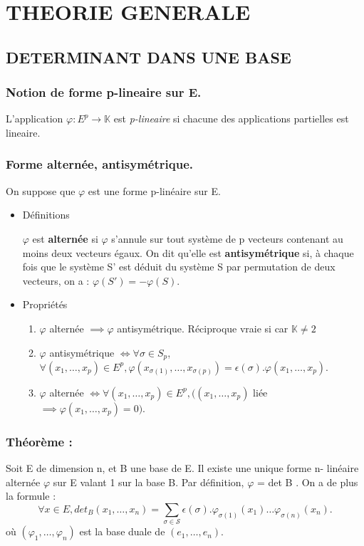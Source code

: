 \documentclass[a4paper,12pt]{article}
\title{\letitle}
\author{\leauthor}
\date{}
\begin{document}
    \section{THEORIE GENERALE}

\subsection{DETERMINANT DANS UNE BASE}

\subsubsection{Notion de forme p-lineaire sur E.}

L'application $\varphi:E^p \rightarrow \mathbb{K}$ est {\it p-lineaire}
si chacune des applications partielles est lineaire.

\subsubsection{Forme alternée, antisymétrique.}

On suppose que $\varphi$ est une forme p-linéaire sur E.
\begin{itemize}
\item Définitions

$\varphi$ est \textbf{ alternée } si $\varphi$ s’annule sur tout système de p vecteurs contenant au moins
deux vecteurs égaux. On dit qu’elle est \textbf{ antisymétrique } si, à chaque fois que le système S'
est déduit du système S par permutation de deux vecteurs, on a : $\varphi(S')=-\varphi(S)$.


\item Propriétés

\begin{enumerate}
\item $\varphi$ alternée $\implies \varphi$ antisymétrique. Réciproque vraie si car $\mathbb{K}\neq 2$

\item $\varphi$ 
antisymétrique
$\iff \forall \sigma \in S_p$, $\forall (x_1,\hdots,x_p) 
\in E^p, \varphi(x_{\sigma(1)},\hdots,x_{\sigma(p)})=\epsilon (\sigma).\varphi(x_1,\hdots,x_p)$.

\item $\varphi$ 
alternée
$\iff \forall (x_1,\hdots,x_p)\in E^p, ((x_1,\hdots,x_p)$
liée
$\implies \varphi (x_1,\hdots,x_p) = 0)$.
\end{enumerate}
\end{itemize}

\subsubsection{\textbf{Théorème :}}
Soit E de dimension n, et B une base de E. Il existe une unique forme n-
linéaire alternée $\varphi$ sur E valant 1 sur la base B. Par déﬁnition, $\varphi$ = det B . On a de plus la
formule :
\begin{equation}\forall x \in E, det_B(x_1,\hdots,x_n)=\sum_{\sigma \in \mathcal{S}} 
\epsilon (\sigma).\varphi_{\sigma(1)}(x_1)\hdots \varphi_{\sigma(n)}(x_n).\end{equation}
où $(\varphi_1,\hdots,\varphi_n)$ est la base duale de $(e_1,\hdots,e_n)$.
\end{document}

